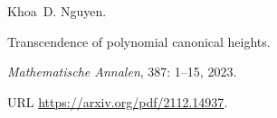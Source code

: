 Khoa~D. Nguyen.

\newblock Transcendence of polynomial canonical heights.

\newblock \emph{Mathematische Annalen}, 387: 1--15, 2023.

\newblock URL \url{https://arxiv.org/pdf/2112.14937}.